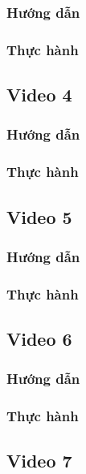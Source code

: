 \documentclass{article}
\begin{document}
\subsubsection{Hướng dẫn}

\subsubsection{Thực hành}




\subsection{Video 4}
\subsubsection{Hướng dẫn}

\subsubsection{Thực hành}




\subsection{Video 5}
\subsubsection{Hướng dẫn}

\subsubsection{Thực hành}




\subsection{Video 6}
\subsubsection{Hướng dẫn}

\subsubsection{Thực hành}




\subsection{Video 7}
\end{document}
